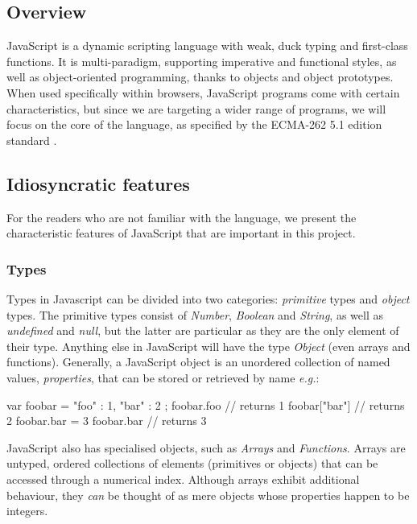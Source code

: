 \subsection{Overview}

JavaScript is a dynamic scripting language with weak, duck typing and first-class functions. It is multi-paradigm, supporting imperative and functional styles, as well as object-oriented programming, thanks to objects and object prototypes. When used specifically within browsers, JavaScript programs come with certain characteristics, but since we are targeting a wider range of programs, we will focus on the core of the language, as specified by the ECMA-262 5.1 edition standard \cite{ecma}.

\subsection{Idiosyncratic features}
For the readers who are not familiar with the language, we present the characteristic features of JavaScript \cite{flanagan2006javascript} that are important in this project.

\subsubsection{Types}
Types in Javascript can be divided into two categories: \emph{primitive} types and \emph{object} types. The primitive types consist of \emph{Number}, \emph{Boolean} and \emph{String}, as well as \textit{undefined} and \textit{null}, but the latter are particular as they are the only element of their type. Anything else in JavaScript will have the type \emph{Object} (even arrays and functions). Generally, a JavaScript object is an unordered collection of named values, \emph{properties}, that can be stored or retrieved by name \emph{e.g.}:

\begin{code}[caption=JavaScript objects,label=jsobj]
var foobar = { "foo" : 1,
               "bar" : 2 };
foobar.foo     // returns 1
foobar["bar"]  // returns 2
foobar.bar = 3
foobar.bar     // returns 3
\end{code}

JavaScript also has specialised objects, such as \emph{Arrays} and \emph{Functions}. Arrays are untyped, ordered collections of elements (primitives or objects) that can be accessed through a numerical index. Although arrays exhibit additional behaviour, they \emph{can} be thought of as mere objects whose properties happen to be integers.

